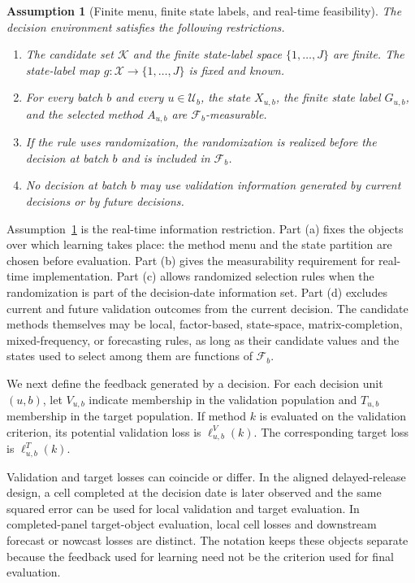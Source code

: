 \documentclass[a4paper, 12pt]{article}
\theoremstyle{plain}
\newtheorem{assumption}{Assumption}
\theoremstyle{remark}
\newcommand{\Kcal}{\mathcal{K}}
\newcommand{\Xcal}{\mathcal{X}}
\newcommand{\Ucal}{\mathcal{U}}
\newcommand{\Fcal}{\mathcal{F}}
\newcommand{\1}{\mathbf{1}}
\begin{document}
\begin{assumption}[Finite menu, finite state labels, and real-time feasibility]
\label{ass:rt-feasibility}
The decision environment satisfies the following restrictions.
\begin{enumerate}[label=(\alph*), leftmargin=*]
    \item The candidate set \(\Kcal\) and the finite state-label space \(\{1,\ldots,J\}\) are finite. The state-label map \(g:\Xcal\to\{1,\ldots,J\}\) is fixed and known.
    \item For every batch \(b\) and every \(u\in\Ucal_b\), the state \(X_{u,b}\), the finite state label \(G_{u,b}\), and the selected method \(A_{u,b}\) are \(\Fcal_b\)-measurable.
    \item If the rule uses randomization, the randomization is realized before the decision at batch \(b\) and is included in \(\Fcal_b\).
    \item No decision at batch \(b\) may use validation information generated by current decisions or by future decisions.
\end{enumerate}
\end{assumption}

Assumption~\ref{ass:rt-feasibility} is the real-time information restriction. Part (a) fixes the objects over which learning takes place: the method menu and the state partition are chosen before evaluation. Part (b) gives the measurability requirement for real-time implementation. Part (c) allows randomized selection rules when the randomization is part of the decision-date information set. Part (d) excludes current and future validation outcomes from the current decision. The candidate methods themselves may be local, factor-based, state-space, matrix-completion, mixed-frequency, or forecasting rules, as long as their candidate values and the states used to select among them are functions of \(\Fcal_b\).

We next define the feedback generated by a decision. For each decision unit \((u,b)\), let \(V_{u,b}\) indicate membership in the validation population and \(T_{u,b}\) membership in the target population. If method \(k\) is evaluated on the validation criterion, its potential validation loss is \(\ell^V_{u,b}(k)\). The corresponding target loss is \(\ell^T_{u,b}(k)\).

Validation and target losses can coincide or differ. In the aligned delayed-release design, a cell completed at the decision date is later observed and the same squared error can be used for local validation and target evaluation. In completed-panel target-object evaluation, local cell losses and downstream forecast or nowcast losses are distinct. The notation keeps these objects separate because the feedback used for learning need not be the criterion used for final evaluation.
\end{document}
